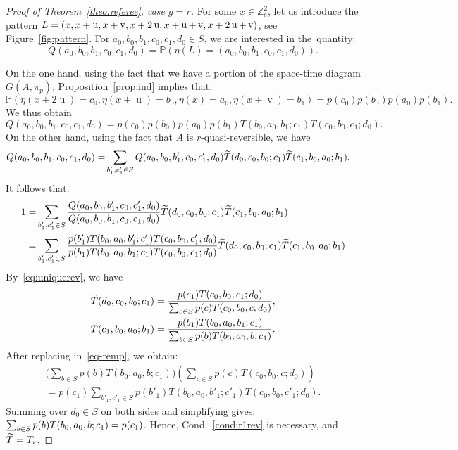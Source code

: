 \documentclass[AHL,Unicode,longabstracts]{cedram}
\let\oldtilde\tilde
\renewcommand*{\tilde}[1]{\mathchoice{\widetilde{#1}}{\widetilde{#1}}{\oldtilde{#1}}{\oldtilde{#1}}}
\newcounter{a}
\newcommand{\Cond}{Cond.}
\newcommand{\Z}{\mathbb{Z}}
\newcommand{\Pbb}{\mathbb{P}}
\DeclareMathOperator{\vu}{u}
\DeclareMathOperator{\vv}{v}
\begin{document}
\begin{proof}[Proof of Theorem~\ref{theo:referee}, case $g=r$]
For some $x \in \Z_{e}^2$, let us introduce the pattern $L=(x,x+\vu,x+\vv,x+2\vu,\linebreak x+\vu+\vv,x+2\vu+\vv)$, see Figure~\ref{fig:pattern}. For $a_0,b_0,b_1,c_0,c_1,d_0 \in S$, we are interested in the~quantity:
\[
Q(a_0,b_0,b_1,c_0,c_1,d_0)=\Pbb\left(\eta(L)=(a_0,b_0,b_1,c_0,c_1,d_0)\right).
\]

On the one hand, using the fact that we have a portion of the space-time diagram $G(A,\pi_p)$, Proposition~\ref{prop:ind} implies that:
\[
\Pbb\left(\eta(x + 2 \vu) = c_0, \eta(x + \vu) = b_0, \eta(x) = a_0, \eta(x + \vv) = b_1\right)=p(c_0) p(b_0) p(a_0) p(b_1).
\]
We thus obtain
\[
Q(a_0,b_0,b_1,c_0,c_1,d_0)= p(c_0) p(b_0) p(a_0) p(b_1) T(b_0,a_0,b_1;c_1) T(c_0,b_0,c_1;d_0).
\]
On the other hand, using the fact that $A$ is $r$-quasi-reversible, we have
\begin{align*}
Q(a_0,b_0,b_1,c_0,c_1,d_0)=&\sum_{b'_1,c'_1\in S}Q(a_0,b_0,b'_1,c_0,c'_1,d_0)\tilde T(d_0,c_0,b_0;c_1)\tilde T(c_1,b_0,a_0;b_1).
\end{align*}
It follows that:
\begin{equation}\label{eq-remp}
\begin{aligned}
1=&\sum_{b'_1,c'_1\in S}\frac{Q(a_0,b_0,b'_1,c_0,c'_1,d_0)}{Q(a_0,b_0,b_1,c_0,c_1,d_0)}\tilde T(d_0,c_0,b_0;c_1)\tilde T(c_1,b_0,a_0;b_1) \\
=&\sum_{b'_1,c'_1\in S} \frac{p(b'_1) T(b_0,a_0,b'_1;c'_1) T(c_0,b_0,c'_1;d_0)}{p(b_1) T(b_0,a_0,b_1;c_1) T(c_0,b_0,c_1;d_0)}\tilde T(d_0,c_0,b_0;c_1)\tilde T(c_1,b_0,a_0;b_1) 
\end{aligned}
\end{equation}
By~\eqref{eq:uniquerev}, we have
\begin{align*}
\tilde T(d_0,c_0,b_0;c_1)=\frac{p(c_1)T(c_0,b_0,c_1;d_0)}{\sum_{c\in S} p(c) T(c_0,b_0,c;d_0)},\\
\tilde T(c_1,b_0,a_0;b_1)=\frac{p(b_1)T(b_0,a_0,b_1;c_1)}{\sum_{b\in S} p(b)T(b_0,a_0,b;c_1)}.
\end{align*}
After replacing in~\eqref{eq-remp}, we obtain:
\begin{multline*}
\bigg(\sum_{b\in S} p(b)T(b_0,a_0,b;c_1)\bigg) \left(\sum_{c\in S}p(c) T(c_0,b_0,c;d_0)\right)\\=p(c_1)\sum_{b'_1,c'_1\in S} p(b'_1)T(b_0,a_0,b'_1;c'_1)T(c_0,b_0,c'_1;d_0).
\end{multline*}
Summing over $d_0\in S$ on both sides and simplifying gives: $\sum_{b\in S} p(b)T(b_0,a_0,b;\linebreak c_1)=p(c_1)$. Hence, \Cond~\ref{cond:r1rev} is necessary, and $\tilde T=T_r$.




\end{proof}
\end{document}
